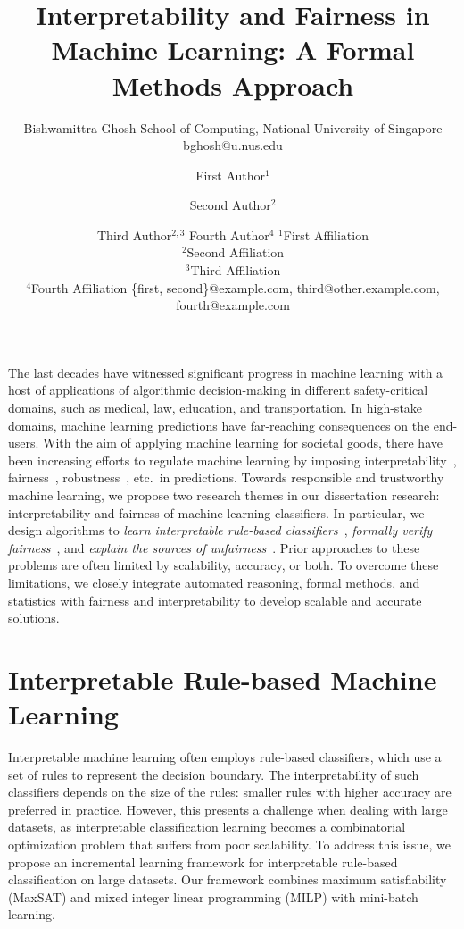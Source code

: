 \documentclass{article}
\title{Interpretability and Fairness in Machine Learning: A Formal Methods Approach}
\author{
    Bishwamittra Ghosh
    \affiliations
    School of Computing, National University of Singapore
    \emails
   bghosh@u.nus.edu
}
\author{
First Author$^1$
\and
Second Author$^2$\and
Third Author$^{2,3}$\And
Fourth Author$^4$
\affiliations
$^1$First Affiliation\\
$^2$Second Affiliation\\
$^3$Third Affiliation\\
$^4$Fourth Affiliation
\emails
\{first, second\}@example.com,
third@other.example.com,
fourth@example.com
}
\begin{document}
\maketitle


The last decades have witnessed significant progress in machine learning with a host of applications of algorithmic decision-making in different safety-critical domains, such as medical, law, education, and transportation. In high-stake domains,  machine learning predictions have far-reaching consequences on the end-users. With the aim of applying machine learning for societal goods, there have been increasing efforts to regulate machine learning by imposing interpretability~\cite{rudin2019stop}, fairness~\cite{barocas2017fairness}, robustness~\cite{rauber2017foolbox},  etc.\ in predictions. Towards responsible and trustworthy machine learning, we propose two research themes in our dissertation research: interpretability and fairness of machine learning classifiers. In particular, we design algorithms to \textit{learn interpretable rule-based classifiers}~\cite{ghosh22efficient,ghosh2019incremental,ghosh2020classification}, \textit{formally verify fairness}~\cite{ghosh2021justicia,ghosh2022algorithmic}, and \textit{explain the sources of unfairness}~\cite{ghosh2022how}. Prior approaches to these problems are often limited by scalability, accuracy, or both. To overcome these limitations, we closely integrate automated reasoning, formal methods, and statistics with fairness and interpretability to develop scalable and accurate solutions.


\section{Interpretable Rule-based Machine Learning}

Interpretable machine learning often employs rule-based classifiers, which use a set of rules to represent the decision boundary. The interpretability of such classifiers depends on the size of the rules: smaller rules with higher accuracy are preferred in practice. However, this presents a challenge when dealing with large datasets, as interpretable classification learning becomes a combinatorial optimization problem that suffers from poor scalability. To address this issue, we propose an incremental learning framework for interpretable rule-based classification on large datasets. Our framework combines maximum satisfiability (MaxSAT) and mixed integer linear programming (MILP) with mini-batch learning.
\end{document}
